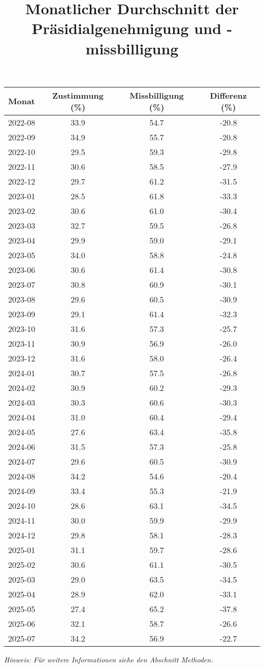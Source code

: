 \documentclass[
]{article}
\title{Monatlicher Durchschnitt der Präsidialgenehmigung und
-missbilligung}
\author{}
\date{\vspace{-2.5em}}
\begin{document}
\maketitle

\begin{table}[ht]
\centering
\begin{tabular}{lccc}
\toprule
Monat & Zustimmung (\%) & Missbilligung (\%) & Differenz (\%) \\
\midrule
2022-08 & 33.9 & 54.7 & -20.8 \\
2022-09 & 34.9 & 55.7 & -20.8 \\
2022-10 & 29.5 & 59.3 & -29.8 \\
2022-11 & 30.6 & 58.5 & -27.9 \\
2022-12 & 29.7 & 61.2 & -31.5 \\
2023-01 & 28.5 & 61.8 & -33.3 \\
2023-02 & 30.6 & 61.0 & -30.4 \\
2023-03 & 32.7 & 59.5 & -26.8 \\
2023-04 & 29.9 & 59.0 & -29.1 \\
2023-05 & 34.0 & 58.8 & -24.8 \\
2023-06 & 30.6 & 61.4 & -30.8 \\
2023-07 & 30.8 & 60.9 & -30.1 \\
2023-08 & 29.6 & 60.5 & -30.9 \\
2023-09 & 29.1 & 61.4 & -32.3 \\
2023-10 & 31.6 & 57.3 & -25.7 \\
2023-11 & 30.9 & 56.9 & -26.0 \\
2023-12 & 31.6 & 58.0 & -26.4 \\
2024-01 & 30.7 & 57.5 & -26.8 \\
2024-02 & 30.9 & 60.2 & -29.3 \\
2024-03 & 30.3 & 60.6 & -30.3 \\
2024-04 & 31.0 & 60.4 & -29.4 \\
2024-05 & 27.6 & 63.4 & -35.8 \\
2024-06 & 31.5 & 57.3 & -25.8 \\
2024-07 & 29.6 & 60.5 & -30.9 \\
2024-08 & 34.2 & 54.6 & -20.4 \\
2024-09 & 33.4 & 55.3 & -21.9 \\
2024-10 & 28.6 & 63.1 & -34.5 \\
2024-11 & 30.0 & 59.9 & -29.9 \\
2024-12 & 29.8 & 58.1 & -28.3 \\
2025-01 & 31.1 & 59.7 & -28.6 \\
2025-02 & 30.6 & 61.1 & -30.5 \\
2025-03 & 29.0 & 63.5 & -34.5 \\
2025-04 & 28.9 & 62.0 & -33.1 \\
2025-05 & 27.4 & 65.2 & -37.8 \\
2025-06 & 32.1 & 58.7 & -26.6 \\
2025-07 & 34.2 & 56.9 & -22.7\\
\bottomrule
\end{tabular}
\end{table}
\vspace{5pt}
\parbox{\linewidth}{\centering \textit{Hinweis: Für weitere Informationen siehe den Abschnitt Methoden.}}
\end{document}
